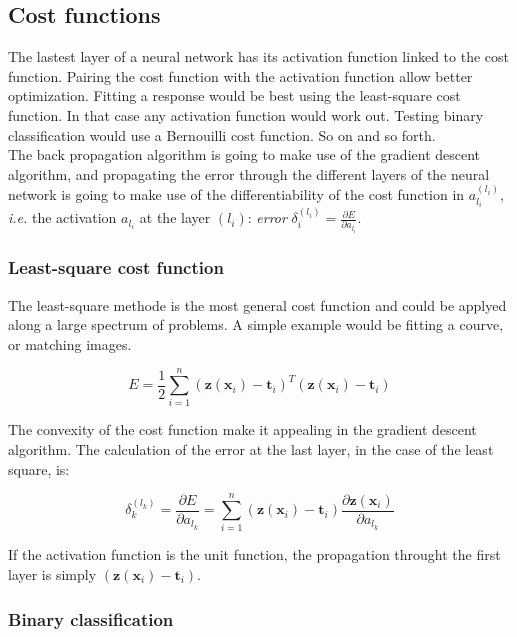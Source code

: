 \documentclass[final, paper=letter,5p,times,twocolumn]{elsarticle}
\begin{document}
\subsection{Cost functions}
\label{sec:cost_functions}

The lastest layer of a neural network has its activation function linked to the cost function. Pairing the cost function with the activation function allow better optimization. Fitting a response would be best using the least-square cost function. In that case any activation function would work out. Testing binary classification would use a Bernouilli cost function. So on and so forth.\\
The back propagation algorithm is going to make use of the gradient descent algorithm, and propagating the error through the different layers of the neural network is going to make use of the differentiability of the cost function in $a_{l_{i}}^{(l_{i})}$, {\it i.e.} the activation $a_{l_{i}}$ at the layer $(l_{i})$: {\it error} $\delta_{i}^{(l_{i})} = \frac{\partial E}{\partial a_{l_{i}}}$.

\subsubsection{Least-square cost function}

The least-square methode is the most general cost function and could be applyed along a large spectrum of problems. A simple example would be fitting a courve, or matching images. 

\begin{equation}
  E = \frac{1}{2} \sum_{i = 1}^{n} (\bm{z}(\bm{x}_{i}) - \bm{t}_{i})^{T}(\bm{z}(\bm{x}_{i}) - \bm{t}_{i})
  \label{eq:least_squarre}
\end{equation}

The convexity of the cost function make it appealing in the gradient descent algorithm. The calculation of the error at the last layer, in the case of the least square, is:

\begin{equation}
  \delta_{k}^{(l_{k})} = \frac{\partial E}{\partial a_{l_{k}}} = \sum_{i = 1}^{n} (\bm{z}(\bm{x}_{i}) - \bm{t}_{i})\frac{\partial \bm{z}(\bm{x}_{i})}{\partial a_{l_{k}}}
  \label{eq:least_squarre_error}
\end{equation}
 
If the activation function is the unit function, the propagation throught the first layer is simply $(\bm{z}(\bm{x}_{i}) - \bm{t}_{i})$.
\subsubsection{Binary classification}
\end{document}
